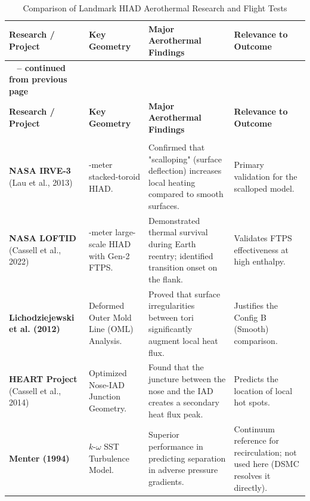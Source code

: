\begin{longtable}{|>{\RaggedRight\arraybackslash}p{}|>{\RaggedRight\arraybackslash}p{}|>{\RaggedRight\arraybackslash}p{}|>{\RaggedRight\arraybackslash}p{}|}
\caption{Comparison of Landmark HIAD Aerothermal Research and Flight Tests} \label{tab:research_comparison} \\
\hline
\textbf{Research / Project} & \textbf{Key Geometry} & \textbf{Major Aerothermal Findings} & \textbf{Relevance to Outcome} \\ \hline
\endfirsthead
\multicolumn{4}{c}%
{{\bfseries \tablename\ \thetable{} -- continued from previous page}} \\
\hline
\textbf{Research / Project} & \textbf{Key Geometry} & \textbf{Major Aerothermal Findings} & \textbf{Relevance to Outcome} \\ \hline
\endhead
\hline \multicolumn{4}{|r|}{{Continued on next page}} \\ \hline
\endfoot
\hline
\endlastfoot

\textbf{NASA IRVE-3} (Lau et al., 2013) & 3-meter stacked-toroid HIAD. & Confirmed that "scalloping" (surface deflection) increases local heating compared to smooth surfaces. & Primary validation for the scalloped model. \\ \hline

\textbf{NASA LOFTID} (Cassell et al., 2022) & 6-meter large-scale HIAD with Gen-2 FTPS. & Demonstrated thermal survival during Earth reentry; identified transition onset on the flank. & Validates FTPS effectiveness at high enthalpy. \\ \hline

\textbf{Licho\-dzie\-jew\-ski et al. (2012)} & Deformed Outer Mold Line (OML) Analysis. & Proved that surface irregularities between tori significantly augment local heat flux. & Justifies the Config B (Smooth) comparison. \\ \hline

\textbf{HEART Project} (Cassell et al., 2014) & Optimized Nose-IAD Junction Geometry. & Found that the juncture between the nose and the IAD creates a secondary heat flux peak. & Predicts the location of local hot spots. \\ \hline

\textbf{Menter (1994)} & $k$-$\omega$ SST Turbulence Model. & Superior performance in predicting separation in adverse pressure gradients. & Continuum reference for recirculation; not used here (DSMC resolves it directly). \\ \hline
\end{longtable}
